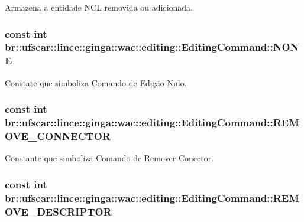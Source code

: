 Armazena a entidade NCL removida ou adicionada. 

\hypertarget{classbr_1_1ufscar_1_1lince_1_1ginga_1_1wac_1_1editing_1_1EditingCommand_a9d41755f098b545424948a5b70dee7e2}{
\subsubsection[{NONE}]{\setlength{\rightskip}{0pt plus 5cm}const int {\bf br::ufscar::lince::ginga::wac::editing::EditingCommand::NONE}}}
\label{classbr_1_1ufscar_1_1lince_1_1ginga_1_1wac_1_1editing_1_1EditingCommand_a9d41755f098b545424948a5b70dee7e2}


Constate que simboliza Comando de Edição Nulo. 

\hypertarget{classbr_1_1ufscar_1_1lince_1_1ginga_1_1wac_1_1editing_1_1EditingCommand_a6914135f126f35caef9da25f88c576c7}{
\subsubsection[{REMOVE\_\-CONNECTOR}]{\setlength{\rightskip}{0pt plus 5cm}const int {\bf br::ufscar::lince::ginga::wac::editing::EditingCommand::REMOVE\_\-CONNECTOR}}}
\label{classbr_1_1ufscar_1_1lince_1_1ginga_1_1wac_1_1editing_1_1EditingCommand_a6914135f126f35caef9da25f88c576c7}


Constante que simboliza Comando de Remover Conector. 

\hypertarget{classbr_1_1ufscar_1_1lince_1_1ginga_1_1wac_1_1editing_1_1EditingCommand_ab477428f9223587f306c0b1bdf46997f}{
\subsubsection[{REMOVE\_\-DESCRIPTOR}]{\setlength{\rightskip}{0pt plus 5cm}const int {\bf br::ufscar::lince::ginga::wac::editing::EditingCommand::REMOVE\_\-DESCRIPTOR}}}
\label{classbr_1_1ufscar_1_1lince_1_1ginga_1_1wac_1_1editing_1_1EditingCommand_ab477428f9223587f306c0b1bdf46997f}



